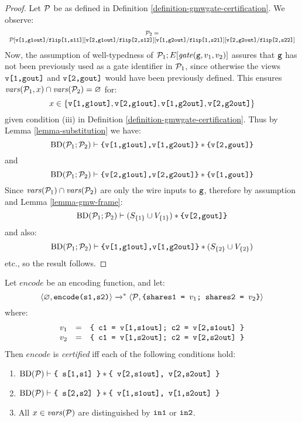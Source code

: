 \begin{proof}
  Let $\mathcal{P}$ be as defined in Definition \ref{definition-gmwgate-certification}.
  We observe:
  $$
  {\footnotesize
    \begin{array}{c}
      \mathcal{P}_2 = \\
      \mathcal{P}[\texttt{v[1,g1out]}/\texttt{flip[1,s11]}][\texttt{v[2,g1out]}/\texttt{flip[2,s12]}][\texttt{v[1,g2out]}/\texttt{flip[1,s21]}][\texttt{v[2,g2out]}/\texttt{flip[2,s22]}]
    \end{array}
  }
  $$ Now, the assumption of well-typedness of
  $\mathcal{P}_1;E[\mathit{gate}(\texttt{g},v_1,v_2)]$ assures that $\texttt{g}$
  has not been previously used as a gate identifier in $\mathcal{P}_1$,
  since otherwise the views $\texttt{v[1,gout]}$ and $\texttt{v[2,gout]}$
  would have been previously defined. This ensures $\mathit{vars}(\mathcal{P}_1,x)
  \cap \mathit{vars}(\mathcal{P}_2) = \varnothing$ for:
  $$x \in \{ \texttt{v[1,g1out]}, \texttt{v[2,g1out]}, \texttt{v[1,g2out]}, \texttt{v[2,g2out]}\}$$
  given condition (iii) in Definition \ref{definition-gmwgate-certification}.
  Thus by Lemma \ref{lemma-substitution} we have:
  $$\mathrm{BD}(\mathcal{P}_1;\mathcal{P}_2) \vdash \texttt{\{v[1,g1out],v[1,g2out]\}} * \texttt{\{v[2,gout]\}}$$
  and
  $$\mathrm{BD}(\mathcal{P}_1;\mathcal{P}_2) \vdash \texttt{\{v[2,g1out],v[2,g2out]\}} * \texttt{\{v[1,gout]\}}$$
  Since $\mathit{vars}(\mathcal{P}_1) \cap \mathit{vars}(\mathcal{P}_2)$ are only the wire inputs to $\texttt{g}$,
  therefore by assumption and Lemma \ref{lemma-gmw-frame}:
  $$\mathrm{BD}(\mathcal{P}_1;\mathcal{P}_2) \vdash (S_{\{1\}} \cup V_{\{1\}}) * \texttt{\{v[2,gout]\}}$$
  and also:
  $$\mathrm{BD}(\mathcal{P}_1;\mathcal{P}_2) \vdash \texttt{\{v[1,g1out],v[1,g2out]\}} * (S_{\{2\}}\cup V_{\{2\}})$$
  etc., so the result follows. 
\end{proof}

\begin{definition}
  Let $\mathit{encode}$ be an encoding function, and let:
  $$
  \langle \varnothing,\texttt{encode(s1,s2)} \rangle \xrightarrow{}^{*}
  \langle \mathcal{P},\texttt{\{shares1 = }v_1\texttt{; shares2 = }v_2\texttt{\}} \rangle
  $$
  where:
  $$
  \begin{array}{rcl}
    v_1 &=& \texttt{\{ c1 = v[1,s1out]; c2 = v[2,s1out] \}}\\
    v_2 &=& \texttt{\{ c1 = v[1,s2out]; c2 = v[2,s2out] \}}
  \end{array}
  $$
  Then $\mathit{encode}$ is \emph{certified} iff each of the following conditions hold:
  \begin{enumerate}[\hspace{5mm}i.]
  \item $\mathrm{BD}(\mathcal{P}) \vdash \texttt{\{ s[1,s1] \}} * \texttt{\{ v[2,s1out], v[2,s2out] \}}$
  \item $\mathrm{BD}(\mathcal{P}) \vdash \texttt{\{ s[2,s2] \}} * \texttt{\{ v[1,s1out], v[1,s2out] \}}$
  \item All $x \in \mathit{vars}(\mathcal{P})$ are distinguished by $\texttt{in1}$ or $\texttt{in2}$. 
  \end{enumerate}
\end{definition}

